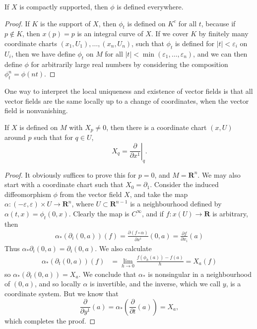 \begin{theorem}
    If $X$ is compactly supported, then $\phi$ is defined everywhere.
\end{theorem}
\begin{proof}
    If $K$ is the support of $X$, then $\phi_t$ is defined on $K^c$ for all $t$, because if $p \not \in K$, then $x(p) = p$ is an integral curve of $X$. If we cover $K$ by finitely many coordinate charts $(x_1,U_1), \dots, (x_n,U_n)$, such that $\phi_t$ is defined for $|t| < \varepsilon_i$ on $U_i$, then we have define $\phi_t$ on $M$ for all $|t| < \min(\varepsilon_1, \dots, \varepsilon_n)$, and we can then define $\phi$ for arbitrarily large real numbers by considering the composition $\phi^n_t = \phi(nt)$.
\end{proof}

One way to interpret the local uniqueness and existence of vector fields is that all vector fields are the same locally up to a change of coordinates, when the vector field is nonvanishing.

\begin{theorem}
    If $X$ is defined on $M$ with $X_p \neq 0$, then there is a coordinate chart $(x,U)$ around $p$ such that for $q \in U$,
    \[ X_q = \left. \frac{\partial}{\partial x^1} \right|_q. \]
\end{theorem}
\begin{proof}
    It obviously suffices to prove this for $p = 0$, and $M = \mathbf{R}^n$. We may also start with a coordinate chart such that $X_0 = \partial_1$. Consider the induced diffeomorphism $\phi$ from the vector field $X$, and take the map $\alpha: (-\varepsilon, \varepsilon) \times U \to \mathbf{R}^n$, where $U \subset \mathbf{R}^{n-1}$ is a neighbourhood defined by $\alpha(t,x) = \phi_t(0,x)$. Clearly the map is $C^\infty$, and if $f: x(U) \to \mathbf{R}$ is arbitrary, then
    \begin{align*}
        \alpha_* \left( \partial_i(0,a) \right)(f) = \frac{\partial (f \circ \alpha)}{\partial x^i} (0,a) = \frac{\partial f}{\partial x_i}(a)
    \end{align*}
    Thus $\alpha_* \partial_i(0,a) = \partial_i(0,a)$. We also calculate
    \begin{align*}
        \alpha_* \left( \partial_t(0,a) \right) (f) &= \lim_{h \to 0} \frac{f(\phi_{h}(a)) - f(a)}{h} = X_a(f)
    \end{align*}
    so $\alpha_*(\partial_t(0,a)) = X_a$. We conclude that $\alpha_*$ is nonsingular in a neighbourhood of $(0,a)$, and so locally $\alpha$ is invertible, and the inverse, which we call $y$, is a coordinate system. But we know that
    \[ \frac{\partial}{\partial y^1}(a) = \alpha_* \left( \frac{\partial}{\partial t}(a) \right) = X_a, \]
    which completes the proof.
\end{proof}

